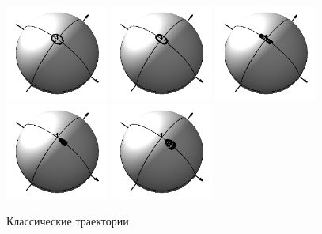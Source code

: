 \begin{figure}[!ht]
  \centering
	\includegraphics[width=0.3\textwidth]{../pictures/rigid_base/plot_J=10n=0.png}
	\includegraphics[width=0.3\textwidth]{../pictures/rigid_base/plot_J=15n=0.png}
	\includegraphics[width=0.3\textwidth]{../pictures/rigid_base/plot_J=20n=0.png} \\
	\includegraphics[width=0.3\textwidth]{../pictures/rigid_base/plot_J=21n=0.png}
	\includegraphics[width=0.3\textwidth]{../pictures/rigid_base/plot_J=22n=0.png}
	\caption{Классические траектории}
	\label{fig:rigid_base}
\end{figure}